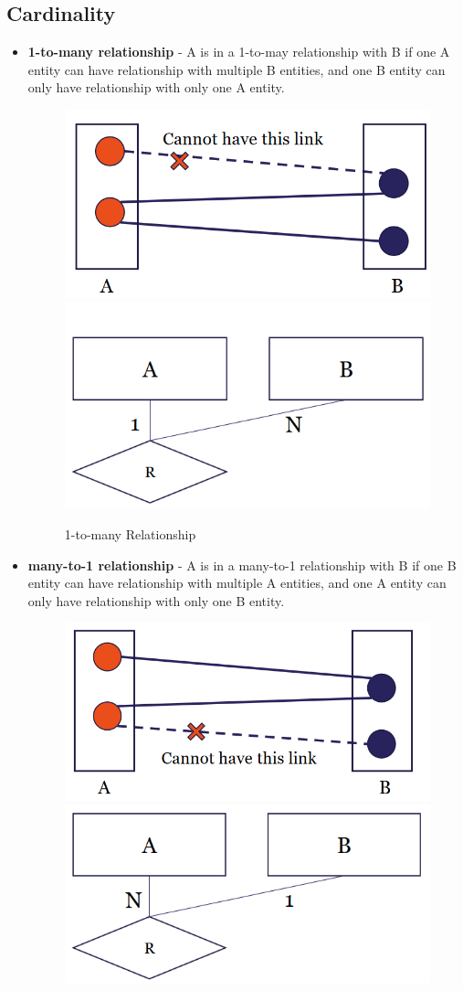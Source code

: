 \subsection{Cardinality}
\begin{itemize}
\item \textbf{1-to-many relationship} - A is in a 1-to-may relationship with B if one A entity can have relationship with multiple B entities, and one B entity can only have relationship with only one A entity.
\begin{figure}[H]
\centering
\includegraphics[width=.45\textwidth]{images/1-to-many1.PNG}
\includegraphics[width=.5\textwidth]{images/1-to-many2.PNG}
\label{1-to-many}
\caption{1-to-many Relationship}
\end{figure}
\item \textbf{many-to-1 relationship} - A is in a many-to-1 relationship with B if one B entity can have relationship with multiple A entities, and one A entity can only have relationship with only one B entity.
\begin{figure}[H]
\centering
\includegraphics[width=.45\textwidth]{images/many-to-one1.PNG}
\includegraphics[width=.5\textwidth]{images/many-to-one2.PNG}

\end{figure}
\end{itemize}

